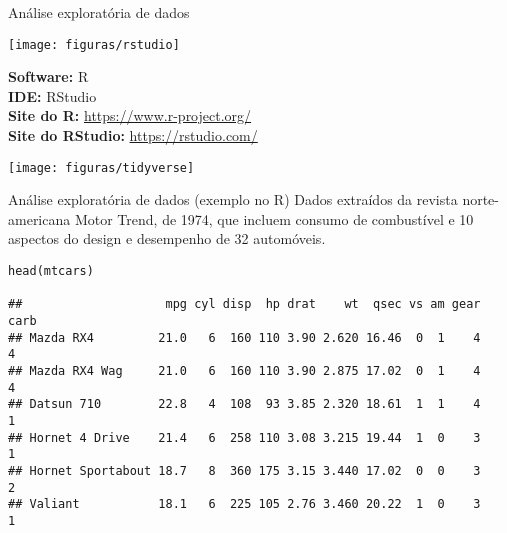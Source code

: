 \documentclass[xcolor=table,t]{beamer}
\begin{document}
\begin{frame}[c]{Análise exploratória de dados}
\hspace{-1.50 cm}\begin{minipage}[c]{4.0 cm}
	\centering
	\texttt{[image: figuras/rstudio]} 
\end{minipage}
\hspace{0.3 cm}
\begin{minipage}[r]{7 cm}
   \small \textbf{Software:} R  \\
	\textbf{IDE:} RStudio \\ 
	\textbf{Site do R:} \href{https://www.r-project.org/}{https://www.r-project.org/} \\
	\textbf{Site do RStudio:} \href{https://rstudio.com/}{https://rstudio.com/} \\
\end{minipage}

\vspace{0.5 cm}
\texttt{[image: figuras/tidyverse]} 
\end{frame}

\begin{frame}[c, fragile]{Análise exploratória de dados (exemplo no R)}
\justifying
Dados extraídos da revista norte-americana Motor Trend, de 1974, que incluem consumo de combustível e 10 aspectos do design e desempenho de 32 automóveis.
\vspace{0.4 cm}
\scriptsize
\begin{verbatim}
head(mtcars)

##                    mpg cyl disp  hp drat    wt  qsec vs am gear carb
## Mazda RX4         21.0   6  160 110 3.90 2.620 16.46  0  1    4    4
## Mazda RX4 Wag     21.0   6  160 110 3.90 2.875 17.02  0  1    4    4
## Datsun 710        22.8   4  108  93 3.85 2.320 18.61  1  1    4    1
## Hornet 4 Drive    21.4   6  258 110 3.08 3.215 19.44  1  0    3    1
## Hornet Sportabout 18.7   8  360 175 3.15 3.440 17.02  0  0    3    2
## Valiant           18.1   6  225 105 2.76 3.460 20.22  1  0    3    1
\end{verbatim}
\end{frame}
\end{document}
